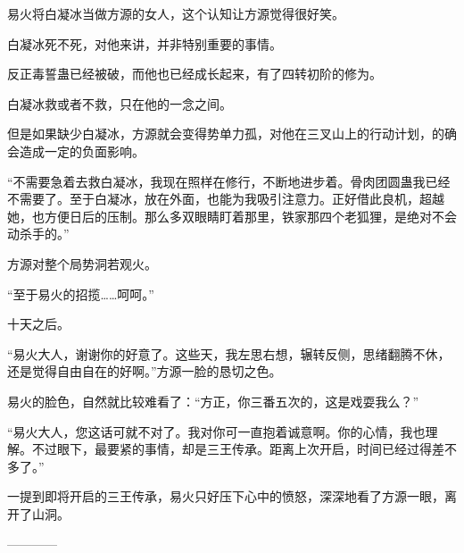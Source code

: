 \begin{this_body}
易火将白凝冰当做方源的女人，这个认知让方源觉得很好笑。

白凝冰死不死，对他来讲，并非特别重要的事情。

反正毒誓蛊已经被破，而他也已经成长起来，有了四转初阶的修为。

白凝冰救或者不救，只在他的一念之间。

但是如果缺少白凝冰，方源就会变得势单力孤，对他在三叉山上的行动计划，的确会造成一定的负面影响。

“不需要急着去救白凝冰，我现在照样在修行，不断地进步着。骨肉团圆蛊我已经不需要了。至于白凝冰，放在外面，也能为我吸引注意力。正好借此良机，超越她，也方便日后的压制。那么多双眼睛盯着那里，铁家那四个老狐狸，是绝对不会动杀手的。”

方源对整个局势洞若观火。

“至于易火的招揽……呵呵。”

十天之后。

“易火大人，谢谢你的好意了。这些天，我左思右想，辗转反侧，思绪翻腾不休，还是觉得自由自在的好啊。”方源一脸的恳切之色。

易火的脸色，自然就比较难看了：“方正，你三番五次的，这是戏耍我么？”

“易火大人，您这话可就不对了。我对你可一直抱着诚意啊。你的心情，我也理解。不过眼下，最要紧的事情，却是三王传承。距离上次开启，时间已经过得差不多了。”

一提到即将开启的三王传承，易火只好压下心中的愤怒，深深地看了方源一眼，离开了山洞。

------------

\end{this_body}

